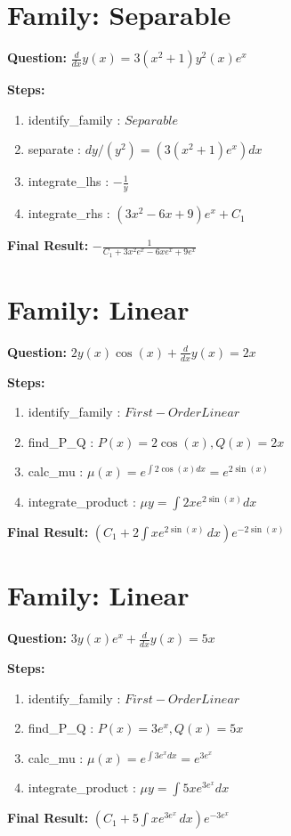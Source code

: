 \documentclass{article}
\begin{document}
\section*{Family: Separable}
\textbf{Question:} $\frac{d}{d x} y{\left(x \right)} = 3 \left(x^{2} + 1\right) y^{2}{\left(x \right)} e^{x}$

\textbf{Steps:}
\begin{enumerate}
\item identify_family :  $Separable$
\item separate :  $dy / (y^{2}) = (3 \left(x^{2} + 1\right) e^{x}) dx$
\item integrate_lhs :  $- \frac{1}{y}$
\item integrate_rhs :  $\left(3 x^{2} - 6 x + 9\right) e^{x} + C_1$
\end{enumerate}
\textbf{Final Result:} $- \frac{1}{C_{1} + 3 x^{2} e^{x} - 6 x e^{x} + 9 e^{x}}$

\section*{Family: Linear}
\textbf{Question:} $2 y{\left(x \right)} \cos{\left(x \right)} + \frac{d}{d x} y{\left(x \right)} = 2 x$

\textbf{Steps:}
\begin{enumerate}
\item identify_family :  $First-Order Linear$
\item find_P_Q :  $P(x)=2 \cos{\left(x \right)}, Q(x)=2 x$
\item calc_mu :  $\mu(x) = e^{\int 2 \cos{\left(x \right)} dx} = e^{2 \sin{\left(x \right)}}$
\item integrate_product :  $\mu y = \int 2 x e^{2 \sin{\left(x \right)}} dx$
\end{enumerate}
\textbf{Final Result:} $\left(C_{1} + 2 \int x e^{2 \sin{\left(x \right)}}\, dx\right) e^{- 2 \sin{\left(x \right)}}$

\section*{Family: Linear}
\textbf{Question:} $3 y{\left(x \right)} e^{x} + \frac{d}{d x} y{\left(x \right)} = 5 x$

\textbf{Steps:}
\begin{enumerate}
\item identify_family :  $First-Order Linear$
\item find_P_Q :  $P(x)=3 e^{x}, Q(x)=5 x$
\item calc_mu :  $\mu(x) = e^{\int 3 e^{x} dx} = e^{3 e^{x}}$
\item integrate_product :  $\mu y = \int 5 x e^{3 e^{x}} dx$
\end{enumerate}
\textbf{Final Result:} $\left(C_{1} + 5 \int x e^{3 e^{x}}\, dx\right) e^{- 3 e^{x}}$
\end{document}
